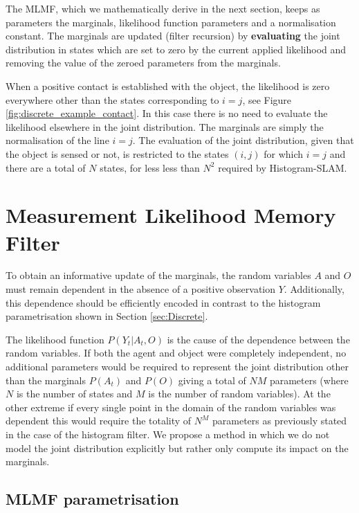 The MLMF, which we mathematically derive in the next section, keeps as parameters the marginals, likelihood function parameters and a normalisation 
constant. The marginals are updated (filter recursion) by \textbf{evaluating} the joint distribution in states which are set to zero by the current 
applied likelihood and removing the value of the zeroed parameters from the marginals. 

When a positive contact is established with the object, the likelihood is zero everywhere other than the states corresponding to  $i=j$, 
see Figure \ref{fig:discrete_example_contact}. In this case there is no need to evaluate the likelihood elsewhere
in the joint distribution. The marginals are simply the normalisation of the line $i=j$. The evaluation of the joint distribution, 
given that the object is sensed or not, is restricted to the states $(i,j)$ for which $i=j$ and there are a total of $N$ states,
for less less than $N^2$ required by Histogram-SLAM.


\FloatBarrier
\section{Measurement Likelihood Memory Filter}\label{ch5:MLMF}

To obtain an informative update of the marginals, the random variables $A$ and $O$ must remain 
dependent in the absence of a positive observation $Y$. Additionally, this dependence should be efficiently encoded in contrast to the
histogram parametrisation shown in Section \ref{sec:Discrete}. 

The likelihood function $P(Y_t|A_t,O)$ is the cause of the dependence between the random variables. If both the agent and object 
were completely independent, no additional parameters would be required to represent the joint distribution other than the marginals 
$P(A_t)$ and $P(O)$ giving a total of $N M$ parameters (where $N$ is the number of states and $M$ is the number of random variables). 
At the other extreme if every single point in the domain of the random variables was dependent this would require the totality 
of $N^M$ parameters as previously stated in the case of the histogram filter. We propose a method in which we do not model the joint
distribution explicitly but rather only compute its impact on the marginals. 

\subsection{MLMF parametrisation}

